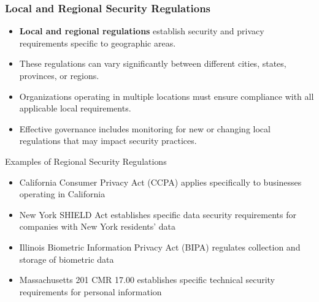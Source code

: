 \documentclass{beamer}
\begin{document}
\begin{frame}
\frametitle{Local and Regional Security Regulations}
\begin{itemize}
\item \textbf{Local and regional regulations} establish security and privacy requirements specific to geographic areas.
\item These regulations can vary significantly between different cities, states, provinces, or regions.
\item Organizations operating in multiple locations must ensure compliance with all applicable local requirements.
\item Effective governance includes monitoring for new or changing local regulations that may impact security practices.
\end{itemize}

\begin{exampleblock}{Examples of Regional Security Regulations}
    \scriptsize
\begin{itemize}
\item California Consumer Privacy Act (CCPA) applies specifically to businesses operating in California
\item New York SHIELD Act establishes specific data security requirements for companies with New York residents' data
\item Illinois Biometric Information Privacy Act (BIPA) regulates collection and storage of biometric data
\item Massachusetts 201 CMR 17.00 establishes specific technical security requirements for personal information
\end{itemize}
\end{exampleblock}
\end{frame}
\end{document}
